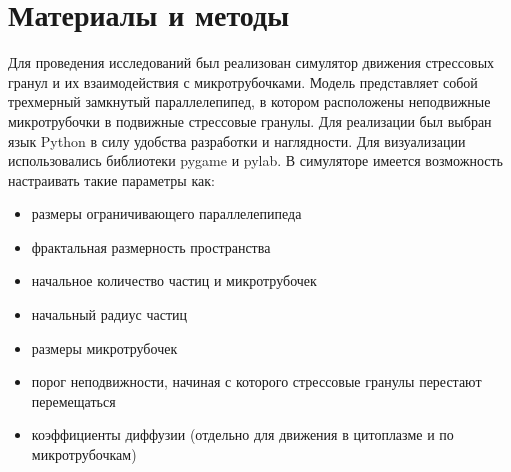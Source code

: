 \documentclass[14pt,a4paper]{extarticle}
\begin{document}
\section{Материалы и методы}

	Для проведения исследований был реализован симулятор движения стрессовых гранул и их взаимодействия с микротрубочками. Модель представляет собой трехмерный замкнутый параллелепипед, в котором расположены неподвижные микротрубочки в подвижные стрессовые гранулы. Для реализации был выбран язык Python в силу удобства разработки и наглядности. Для визуализации использовались библиотеки pygame и pylab. В симуляторе имеется возможность настраивать такие параметры как:

	\begin{itemize}
	\item размеры ограничивающего параллелепипеда
	\item фрактальная размерность пространства
	\item начальное количество частиц и микротрубочек
	\item начальный радиус частиц
	\item размеры микротрубочек
	\item порог неподвижности, начиная с которого стрессовые гранулы перестают перемещаться
	\item коэффициенты диффузии (отдельно для движения в цитоплазме и по микротрубочкам)
	\end{itemize}
\end{document}
